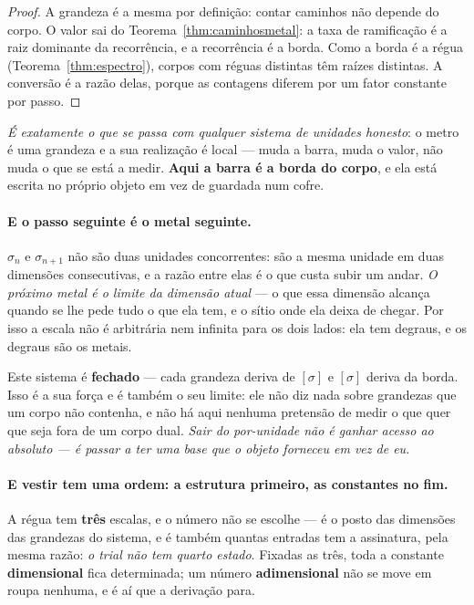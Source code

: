 \documentclass[livro.tex]{subfiles}
\begin{document}
\begin{proof}
A grandeza é a mesma por definição: contar caminhos não depende do corpo. O valor sai do
Teorema~\ref{thm:caminhosmetal}: a taxa de ramificação é a raiz dominante da recorrência, e a
recorrência é a borda. Como a borda é a régua (Teorema~\ref{thm:espectro}), corpos com réguas
distintas têm raízes distintas. A conversão é a razão delas, porque as contagens diferem por um
fator constante por passo.
\end{proof}

\noindent \emph{É exatamente o que se passa com qualquer sistema de unidades honesto}: o metro é
uma grandeza e a sua realização é local --- muda a barra, muda o valor, não muda o que se está a
medir. \textbf{Aqui a barra é a borda do corpo}, e ela está escrita no próprio objeto em vez de
guardada num cofre.

\paragraph{E o passo seguinte é o metal seguinte.} $\sigma_n$ e $\sigma_{n+1}$ não são duas
unidades concorrentes: são a mesma unidade em duas dimensões consecutivas, e a razão entre elas é
o que custa subir um andar. \emph{O próximo metal é o limite da dimensão atual} --- o que essa
dimensão alcança quando se lhe pede tudo o que ela tem, e o sítio onde ela deixa de chegar. Por
isso a escala não é arbitrária nem infinita para os dois lados: ela tem degraus, e os degraus são
os metais.

\medskip
\noindent Este sistema é \textbf{fechado} --- cada
grandeza deriva de $[\sigma]$ e $[\sigma]$ deriva da borda. Isso é a sua força e é também o seu
limite: ele não diz nada sobre grandezas que um corpo não contenha, e não há aqui nenhuma
pretensão de medir o que quer que seja fora de um corpo dual. \emph{Sair do por-unidade não é
ganhar acesso ao absoluto --- é passar a ter uma base que o objeto forneceu em vez de eu.}

\paragraph{E vestir tem uma ordem: a estrutura primeiro, as constantes no fim.} A régua tem
\textbf{três} escalas, e o número não se escolhe --- é o posto das dimensões das grandezas do
sistema, e é também quantas entradas tem a assinatura, pela mesma razão: \emph{o trial não tem
quarto estado}. Fixadas as três, toda a constante \textbf{dimensional} fica determinada; um número
\textbf{adimensional} não se move em roupa nenhuma, e é aí que a derivação para.
\end{document}
